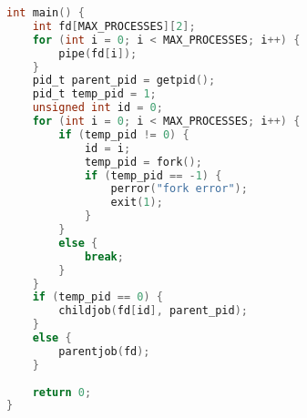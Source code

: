 \begin{lstlisting}[language=C]
int main() {
    int fd[MAX_PROCESSES][2];
    for (int i = 0; i < MAX_PROCESSES; i++) {
        pipe(fd[i]);
    }
    pid_t parent_pid = getpid();
    pid_t temp_pid = 1;
    unsigned int id = 0;
    for (int i = 0; i < MAX_PROCESSES; i++) {
        if (temp_pid != 0) {
            id = i;
            temp_pid = fork();
            if (temp_pid == -1) {
                perror("fork error");
                exit(1);
            }
        }
        else {
            break;
        }
    }
    if (temp_pid == 0) {
        childjob(fd[id], parent_pid);
    }
    else {
        parentjob(fd);
    }
    
    return 0;
}

\end{lstlisting}

\pagebreak